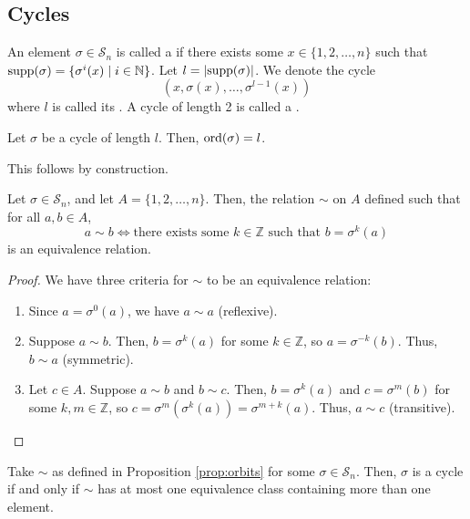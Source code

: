 \subsection*{Cycles}

\begin{defn}
An element $ \sigma\in\mathcal{S}_n $ is called a  if there exists some $ x\in\{1,2,\ldots,n\} $ such that $ \operatorname{supp}(\sigma)=\{\sigma^i(x)\mid i\in\mathbb{N}\} $. Let $ l=\lvert\operatorname{supp}(\sigma)\rvert $. We denote the cycle
\begin{equation*}
    \left(x,\sigma(x),\ldots,\sigma^{l-1}(x)\right)
\end{equation*}
where $ l $ is called its . A cycle of length 2 is called a .
\end{defn}

\begin{prop}
Let $ \sigma $ be a cycle of length $ l $. Then, $ \operatorname{ord}(\sigma)=l $.
\end{prop}

This follows by construction.

\begin{prop}\label{prop:orbits}
Let $ \sigma\in\mathcal{S}_n $, and let $ A=\{1,2,\ldots,n\} $. Then, the relation $ \sim $ on $ A $ defined such that for all $ a,b\in A $,
\begin{equation*}
    a\sim b \iff \text{there exists some }k\in\mathbb{Z}\text{ such that }b=\sigma^k(a)
\end{equation*}
is an equivalence relation.
\end{prop}
\begin{proof}
We have three criteria for $ \sim $ to be an equivalence relation:
\begin{enumerate}
    \item Since $ a=\sigma^0(a) $, we have $ a\sim a $ (reflexive).
    \item Suppose $ a\sim b $. Then, $ b=\sigma^k(a) $ for some $ k\in\mathbb{Z} $, so $ a=\sigma^{-k}(b) $. Thus, $ b\sim a $ (symmetric).
    \item Let $ c\in A $. Suppose $ a\sim b $ and $ b\sim c $. Then, $ b=\sigma^k(a) $ and $ c=\sigma^m(b) $ for some $ k,m\in\mathbb{Z} $, so $ c=\sigma^m(\sigma^k(a))=\sigma^{m+k}(a) $. Thus, $ a\sim c $ (transitive).\qedhere
\end{enumerate}
\end{proof}

\begin{cor}
Take $ \sim $ as defined in Proposition \ref{prop:orbits} for some $ \sigma\in\mathcal{S}_n $. Then, $ \sigma $ is a cycle if and only if $ \sim $ has at most one equivalence class containing more than one element.
\end{cor}

